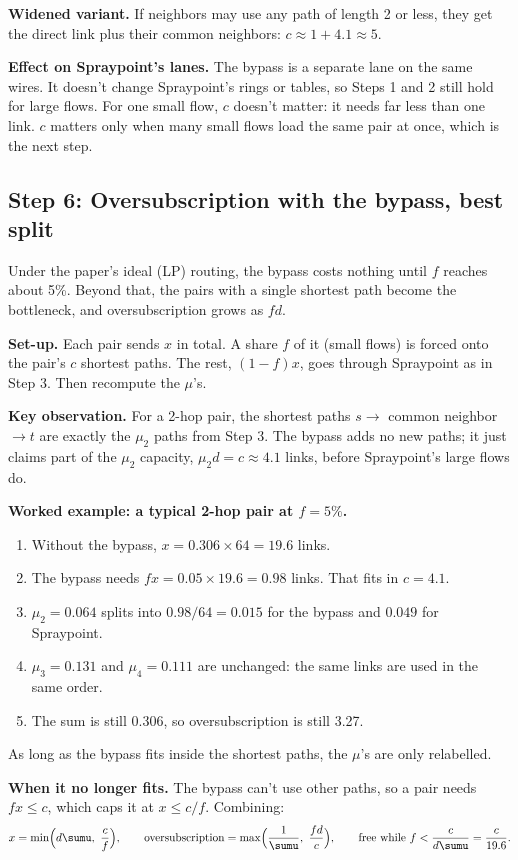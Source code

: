 \textbf{Widened variant.} If neighbors may use any path of length 2 or less, they get the direct link plus their common neighbors: $c \approx 1 + 4.1 \approx 5$.

\textbf{Effect on Spraypoint's lanes.} The bypass is a separate lane on the same wires. It doesn't change Spraypoint's rings or tables, so Steps 1 and 2 still hold for large flows. For one small flow, $c$ doesn't matter: it needs far less than one link. $c$ matters only when many small flows load the same pair at once, which is the next step.

\subsection{Step 6: Oversubscription with the bypass, best split}

Under the paper's ideal (LP) routing, the bypass costs nothing until $f$ reaches about 5\%. Beyond that, the pairs with a single shortest path become the bottleneck, and oversubscription grows as $f d$.

\textbf{Set-up.} Each pair sends $x$ in total. A share $f$ of it (small flows) is forced onto the pair's $c$ shortest paths. The rest, $(1 - f) x$, goes through Spraypoint as in Step 3. Then recompute the $\mu$'s.

\textbf{Key observation.} For a 2-hop pair, the shortest paths $s \to$ common neighbor $\to t$ are exactly the $\mu_2$ paths from Step 3. The bypass adds no new paths; it just claims part of the $\mu_2$ capacity, $\mu_2 d = c \approx 4.1$ links, before Spraypoint's large flows do.

\textbf{Worked example: a typical 2-hop pair at $f = 5\%$.}
\begin{enumerate}
  \item Without the bypass, $x = 0.306 \times 64 = 19.6$ links.
  \item The bypass needs $f x = 0.05 \times 19.6 = 0.98$ links. That fits in $c = 4.1$.
  \item $\mu_2 = 0.064$ splits into $0.98/64 = 0.015$ for the bypass and $0.049$ for Spraypoint.
  \item $\mu_3 = 0.131$ and $\mu_4 = 0.111$ are unchanged: the same links are used in the same order.
  \item The sum is still 0.306, so oversubscription is still 3.27.
\end{enumerate}
As long as the bypass fits inside the shortest paths, the $\mu$'s are only relabelled.

\textbf{When it no longer fits.} The bypass can't use other paths, so a pair needs $f x \le c$, which caps it at $x \le c/f$. Combining:
\[
x = \min\!\Big( d \sumu,\ \frac{c}{f} \Big),
\qquad
\text{oversubscription} = \max\!\Big( \frac{1}{\sumu},\ \frac{f d}{c} \Big),
\qquad
\text{free while } f < \frac{c}{d \sumu} = \frac{c}{19.6}.
\]

